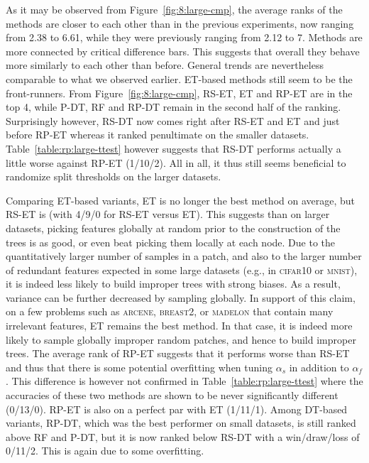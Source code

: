 As it may be observed from Figure~\ref{fig:8:large-cmp}, the average ranks of the
methods are closer to each other than in the previous experiments, now ranging
from 2.38 to 6.61, while they were previously ranging from 2.12 to 7. Methods
are more connected by critical difference bars. This suggests that overall they
behave more similarly to each other than before. General trends are nevertheless
comparable to what we observed earlier. ET-based methods still seem to be the
front-runners.  From Figure~\ref{fig:8:large-cmp}, RS-ET, ET and RP-ET are in the
top 4, while P-DT, RF and RP-DT remain in the second half of the ranking.
Surprisingly however, RS-DT now comes right after RS-ET and ET and just before
RP-ET whereas it ranked penultimate on the smaller datasets. Table~\ref{table:rp:large-ttest}
however suggests that RS-DT performs actually a little worse
against RP-ET (1/10/2).  All in all, it thus still seems beneficial to randomize
split thresholds on the larger datasets.

Comparing ET-based variants, ET is no longer the best method on average, but RS-ET
is (with 4/9/0 for RS-ET versus ET). This suggests than on larger datasets,
picking features globally at random prior to the construction of the trees is as
good, or even beat picking them locally at each node. Due to the quantitatively
larger number of samples in a patch, and also to the larger number of redundant
features expected in some large datasets (e.g., in \textsc{cifar10} or \textsc{mnist}), it is
indeed less likely to build improper trees with strong biases. As a result,
variance can be further decreased by sampling globally. In support of this
claim, on a few problems such as \textsc{arcene}, \textsc{breast2}, or \textsc{madelon} that contain many
irrelevant features, ET remains the best method. In that case, it is indeed more
likely to sample globally improper random patches, and hence to build improper
trees. The average rank of RP-ET suggests that it performs worse than RS-ET and
thus that there is some potential overfitting when tuning $\alpha_s$ in addition to
$\alpha_f$. This difference is however not confirmed in Table~\ref{table:rp:large-ttest}
where the accuracies of these two methods are shown to be never significantly
different (0/13/0). RP-ET is also on a perfect par with ET (1/11/1). Among DT-based variants,
RP-DT, which was the best performer on small datasets, is still
ranked above RF and P-DT, but it is now ranked below RS-DT with a win/draw/loss
of 0/11/2. This is again due to some overfitting.

